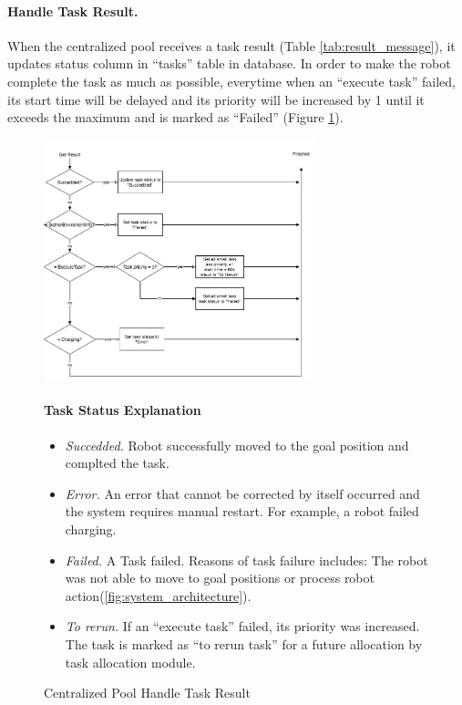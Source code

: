 \paragraph{Handle Task Result.}
When the centralized pool receives a task result (Table \ref{tab:result_message}), it updates status column in ``tasks'' table in database. 
In order to make the robot complete the task as much as possible, everytime when an ``execute task'' failed, its start time will be delayed and its priority will be increased by 1 until it exceeds the maximum and is marked as ``Failed'' 
(Figure \ref{fig:centralized_task_handle}).


\begin{figure}[htbp]
    \centering
    \includegraphics[width = 0.7\textwidth]{content/images/ch4/centralized_task_result.drawio.png}
    \caption{Centralized Pool Handle Task Result}
    \label{fig:centralized_task_handle}
    \paragraph{Task Status Explanation}
    \begin{itemize}     
        \item \textsl{Succedded.} Robot successfully moved to the goal position and complted the task.
        \item \textsl{Error.} An error that cannot be corrected by itself occurred and the system requires manual restart. For example, a robot failed charging.
        \item \textsl{Failed.} A Task failed. Reasons of task failure includes: The robot was not able to move to goal positions or process robot action(\ref{fig:system_architecture}). 
        \item \textsl{To rerun.} If an ``execute task'' failed, its priority was increased. The task is marked as ``to rerun task''  for a future allocation by task allocation module.
    \end{itemize}   
\end{figure}


